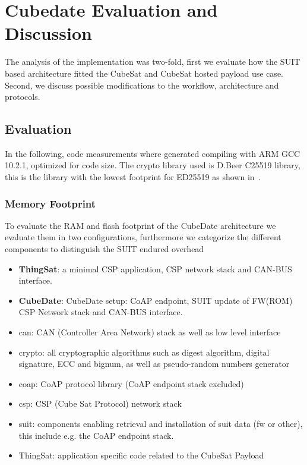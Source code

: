 \section{Cubedate Evaluation and Discussion}
\label{sec:evaluation}

The analysis of the implementation was two-fold, first we evaluate how the SUIT
based architecture fitted the CubeSat and CubeSat hosted payload use case.
Second, we discuss possible modifications to the workflow, architecture and
protocols.

\subsection{Evaluation}

In the following, code measurements where generated compiling with ARM GCC 10.2.1,
optimized for code size. The crypto library used is D.Beer C25519 library, this
is the library with the lowest footprint for ED25519 as shown in~\cite{zandberg2019secure}.

\subsubsection{Memory Footprint}

To evaluate the RAM and flash footprint of the CubeDate architecture we evaluate them
in two configurations, furthermore we categorize the different components to
distinguish the SUIT endured overhead

\begin{itemize}
    \item \textbf{ThingSat}: a minimal CSP application, CSP network stack and CAN-BUS
    interface.
    \item \textbf{CubeDate}: CubeDate setup: CoAP endpoint, SUIT update of FW(ROM)
    CSP Network stack and CAN-BUS interface.
    \item can: CAN (Controller Area Network) stack as well as low level interface
    \item crypto: all cryptographic algorithms such as digest algorithm, digital
    signature, ECC and bignum, as well as pseudo-random numbers generator
    \item coap: CoAP protocol library (CoAP endpoint stack excluded)
    \item csp: CSP (Cube Sat Protocol) network stack
    \item suit: components enabling retrieval and installation of suit data
    (fw or other), this include e.g. the CoAP endpoint stack.
    \item ThingSat: application specific code related to the CubeSat Payload
\end{itemize}

